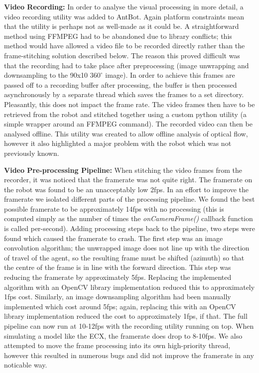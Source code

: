 \documentclass[a4paper,11pt,twoside,openright]{article}
\begin{document}
\textbf{Video Recording:} In order to analyse the visual processing in
more detail, a video recording utility was added to AntBot. Again
platform constraints mean that the utility is perhaps not as well-made
as it could be. A straightforward method using FFMPEG had to be
abandoned due to library conflicts; this method would have allowed a
video file to be recorded directly rather than the frame-stitching
solution described below. The reason this proved difficult was
that the recording had to take place after preprocessing (image
unwrapping and downsampling to the 90x10 $360^{\circ}$ image). In
order to achieve this frames are passed off to a recording buffer
after processing, the buffer is then processed asynchronously by a
separate thread which saves the frames to a set directory. Pleasantly,
this does not impact the frame rate. The video frames then have to be
retrieved from the robot and stitched together using a custom python
utility (a simple wrapper around an FFMPEG command). The recorded
video can then be analysed offline. This utility was created to allow
offline analysis of optical flow, however it also highlighted a major
problem with the robot which was not previously known.
\newline
\par

\textbf{Video Pre-processing Pipeline:}
When stitching the video frames from the recorder, it was noticed that the
framerate was not quite right. The framerate on the robot was found to be
an unacceptably low 2fps. In an effort to improve the framerate we isolated
different parts of the processing pipeline. We found the best possible
framerate to be approximately 14fps with no processing (this is computed simply
as the number of times the \textit{onCameraFrame()} callback function is called
per-second). Adding processing steps back to the pipeline, two steps were found
which caused the framerate to crash. The first step was an image convolution
algorithm; the unwrapped image does not line up with the direction of travel of
the agent, so the resulting frame must be shifted (azimuth) so that the centre of
the frame is in line with the forward direction. This step was reducing the
framerate by approximately 5fps. Replacing the implemented algorithm with an
OpenCV library implementation reduced this to approximately 1fps cost. Similarly,
an image downsampling algorithm had been manually implemented which cost around
5fps; again, replacing this with an OpenCV library implementation reduced the
cost to approximately 1fps, if that. The full pipeline can now run at 10-12fps
with the recording utility running on top. When simulating a model like the ECX,
the framerate does drop to 8-10fps. We also attempted to move the frame
processing into its own high-priority thread, however this resulted in numerous
bugs and did not improve the framerate in any noticable way.
\newline
\par
\end{document}
